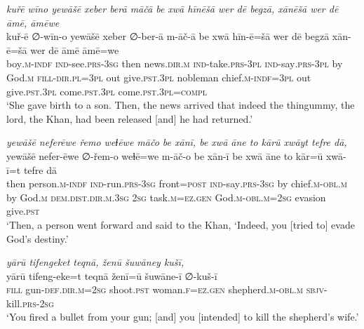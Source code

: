 \ea \label{KŠ.93}
\textit{kuřē wīno yewāšē xeber berā māčā be xwā hīnēšā wer dē begzā, xānēšā wer dē āmē, āmēwe} \\ 
\gll kuř-ē ∅-wīn-o yewāšē xeber ∅-ber-ā m-āč-ā be xwā hīn-ē=šā wer dē begzā xān-ē=šā wer dē āmē āmē=we \\ 
 boy\textsc{.m}\textsc{-indf} \textsc{ind-}see\textsc{.prs}\textsc{-3sg} then news\textsc{.dir}\textsc{.m} \textsc{ind-}take\textsc{.prs}\textsc{-3pl} \textsc{ind-}say\textsc{.prs}\textsc{-3pl} by God\textsc{.m} \textsc{fill}\textsc{-dir}\textsc{.pl}\textsc{=3pl} out give\textsc{.pst}\textsc{.3pl} nobleman chief\textsc{.m}\textsc{-indf}\textsc{=3pl} out give\textsc{.pst}\textsc{.3pl} come\textsc{.pst}\textsc{.3pl} come\textsc{.pst}\textsc{.3pl}\textsc{=compl} \\ 
\glt `She gave birth to a son. Then, the news arrived that indeed the thingummy, the lord, the Khan, had been released [and] he had returned.'
\z 
 
\ea \label{KŠ.97}
\textit{yewāšē neferēwe řemo weɫēwe māčo be xānī, be xwā āne to kārū xwāyt tefre dā,} \\ 
\gll yewāšē nefer-ēwe ∅-řem-o weɫē=we m-āč-o be xān-ī be xwā āne to kār=ū xwā-ī=t tefre dā \\ 
 then person\textsc{.m}\textsc{-indf} \textsc{ind-}run\textsc{.prs}\textsc{-3sg} front\textsc{=\textsc{post}} \textsc{ind-}say\textsc{.prs}\textsc{-3sg} by chief\textsc{.m}\textsc{-obl}\textsc{.m} by God\textsc{.m} \textsc{dem.dist}\textsc{.dir}\textsc{.m}\textsc{.3sg} \textsc{2sg} task\textsc{.m}\textsc{\textsc{=ez.gen}} God\textsc{.m}\textsc{-obl}\textsc{.m}\textsc{=\textsc{2sg}} evasion give\textsc{.pst} \\ 
\glt `Then, a person went forward and said to the Khan, ‘Indeed, you [tried to] evade God’s destiny.'
\z 
 
\ea \label{KŠ.98}
\textit{yārū tifengeket teqnā, ženū šuwāney kušī,} \\ 
\gll yārū tifeng-eke=t teqnā ženī=ū šuwāne-ī ∅-kuš-ī \\ 
 \textsc{fill} gun\textsc{-def}\textsc{.dir}\textsc{.m}\textsc{=\textsc{2sg}} shoot\textsc{.pst} woman\textsc{.f}\textsc{\textsc{=ez.gen}} shepherd\textsc{.m}\textsc{-obl}\textsc{.m} \textsc{sbjv-}kill\textsc{.prs}-\textsc{2sg} \\ 
\glt `You fired a bullet from your gun; [and] you [intended] to kill the shepherd’s wife.'
\z 
 
